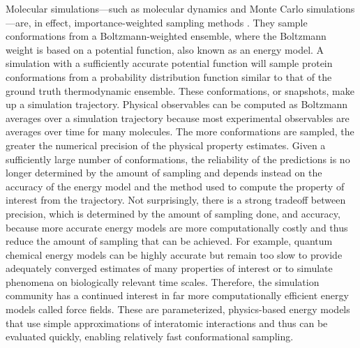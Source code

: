 \documentclass[9pt,review,pubversion]{livecoms}
\begin{document}
Molecular simulations---such as molecular dynamics and Monte Carlo simulations---are, in effect, importance-weighted sampling methods \cite{frenkel_understanding_2001}.
They sample conformations from a Boltzmann-weighted ensemble, where the Boltzmann weight is based on a potential function, also known as an energy model.
A simulation with a sufficiently accurate potential function will sample protein conformations from a probability distribution function similar to that of the ground truth thermodynamic ensemble.
These conformations, or snapshots, make up a simulation trajectory.
Physical observables can be computed as Boltzmann averages over a simulation trajectory because most experimental observables are averages over time for many molecules.
The more conformations are sampled, the greater the numerical precision of the physical property estimates.
Given a sufficiently large number of conformations, the reliability of the predictions is no longer determined by the amount of sampling and depends instead on the accuracy of the energy model and the method used to compute the property of interest from the trajectory.
Not surprisingly, there is a strong tradeoff between precision, which is determined by the amount of sampling done, and accuracy, because more accurate energy models are more computationally costly and thus reduce the amount of sampling that can be achieved.
For example, quantum chemical energy models can be highly accurate but remain too slow to provide adequately converged estimates of many properties of interest or to simulate phenomena on biologically relevant time scales.
Therefore, the simulation community has a continued interest in far more computationally efficient energy models called force fields.
These are parameterized, physics-based energy models that use simple approximations of interatomic interactions and thus can be evaluated quickly, enabling relatively fast conformational sampling.
\end{document}
